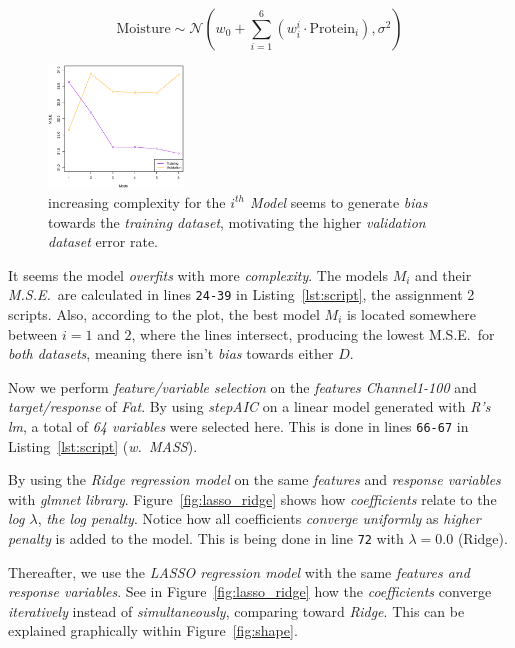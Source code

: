 \documentclass[a4paper, twocolumn]{article}
\begin{document}
    \begin{equation} \label{eq:poly}
        \mathrm{Moisture} \sim \mathcal{N}(w_0 + \sum_{i=1}^6{(w_i^i \cdot \mathrm{Protein}_i)}, \sigma^2)
    \end{equation}

    \begin{figure}[h!]
        \centering
        \caption{increasing complexity for the \emph{$i^{th}$ Model} seems to generate \emph{bias} towards the \emph{training dataset}, motivating the higher \emph{validation dataset} error rate.}
        \label{fig:depends}
        \includegraphics[width=0.32\textwidth]
        {share/depends.eps}
    \end{figure}

    \newpage

    It seems the model \emph{overfits} with more \emph{complexity}. The models $M_i$ and their \emph{M.S.E.}\ are calculated in lines \texttt{24-39} in Listing~\ref{lst:script}, the assignment 2 scripts. Also, according to the plot, the best model $M_i$ is located somewhere between $i = 1$ and $2$, where the lines intersect, producing the lowest M.S.E.\ for \emph{both datasets}, meaning there isn't \emph{bias} towards either $D$.

    Now we perform \emph{feature/variable selection} on the \emph{features Channel1-100} and \emph{target/response} of \emph{Fat}. By using \emph{stepAIC} on a linear model generated with \emph{R's lm}, a total of \emph{64 variables} were selected here. This is done in lines \texttt{66-67} in Listing~\ref{lst:script} (\emph{w.\ MASS}).

    By using the \emph{Ridge regression model} on the same \emph{features} and \emph{response variables} with \emph{glmnet library}. Figure~\ref{fig:lasso_ridge} shows how \emph{coefficients} relate to the \emph{log $\lambda$}, \emph{the log penalty}. Notice how all coefficients \emph{converge uniformly} as \emph{higher penalty} is added to the model. This is being done in line \texttt{72} with $\lambda = 0.0$ (Ridge).

    Thereafter, we use the \emph{LASSO regression model} with the same \emph{features and response variables}. See in Figure~\ref{fig:lasso_ridge} how the \emph{coefficients} converge \emph{iteratively} instead of \emph{simultaneously}, comparing toward \emph{Ridge}. This can be explained graphically within Figure~\ref{fig:shape}.
\end{document}
